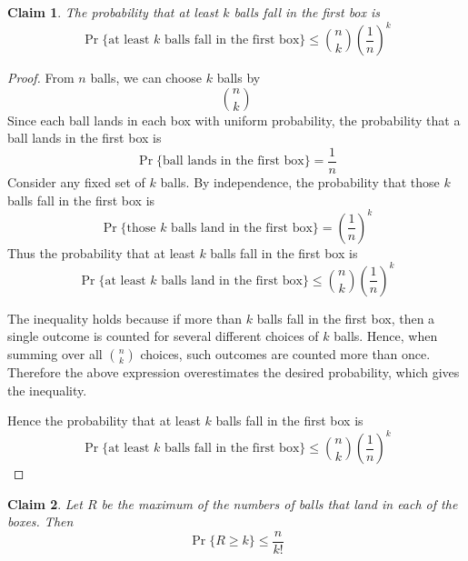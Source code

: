 \documentclass{article}
\newtheorem{claim}{Claim}
\begin{document}
\begin{claim}
    The probability that at least $k$ balls fall in the first box is
    \[
    \Pr\{\text{at least } k \text{ balls fall in the first box}\} \leq \binom{n}{k}\left(\frac{1}{n}\right)^k
    \]
\end{claim}

\begin{proof}
    From $n$ balls, we can choose $k$ balls by
    \[
    \binom{n}{k}
    \]
    Since each ball lands in each box with uniform probability, the probability that a ball lands in the first 
    box is
    \[
    \Pr\{\text{ball lands in the first box}\} = \frac{1}{n}
    \]
    Consider any fixed set of $k$ balls. By independence, the probability that those $k$ balls fall in the 
    first box is
    \[
    \Pr\{\text{those } k \text{ balls land in the first box}\} = \left(\frac{1}{n}\right)^k
    \]
    Thus the probability that at least $k$ balls fall in the first box is
    \[
    \Pr\{\text{at least } k \text{ balls land in the first box}\} \leq \binom{n}{k}\left(\frac{1}{n}\right)^k
    \]

    \medskip

    The inequality holds because if more than $k$ balls fall in the first box, then a single outcome is counted 
    for several different choices of $k$ balls. Hence, when summing over all $\binom{n}{k}$ choices, such 
    outcomes are counted more than once. Therefore the above expression overestimates the desired probability, 
    which gives the inequality.

    \medskip

    Hence the probability that at least $k$ balls fall in the first box is
    \[
    \Pr\{\text{at least } k \text{ balls fall in the first box}\} \leq \binom{n}{k}\left(\frac{1}{n}\right)^k
    \]
\end{proof}

\begin{claim}
    Let $R$ be the maximum of the numbers of balls that land in each of the boxes. Then 
    \[
    \Pr\{R \geq k\} \leq \frac{n}{k!}
    \]
\end{claim}
\end{document}
